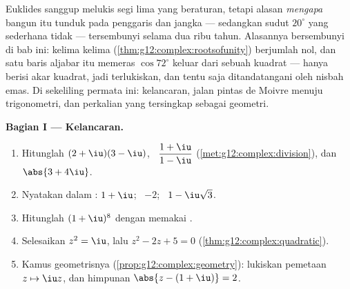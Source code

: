\begin{problem}
\label{pb:g12:complex:1}
Euklides sanggup melukis segi lima yang beraturan, tetapi alasan
\emph{mengapa} bangun itu tunduk pada penggaris dan jangka --- sedangkan
sudut $20^\circ$ yang sederhana tidak --- tersembunyi selama dua ribu
tahun. Alasannya bersembunyi di bab ini: kelima  kelima
(\cref{thm:g12:complex:rootsofunity}) berjumlah nol, dan satu
baris aljabar itu memeras $\cos 72^\circ$ keluar dari sebuah 
kuadrat --- hanya berisi akar kuadrat, jadi terlukiskan, dan tentu saja
ditandatangani oleh nisbah emas. Di sekeliling permata ini: kelancaran, jalan
pintas de Moivre menuju trigonometri, dan perkalian yang tersingkap sebagai
geometri.

\medskip
\noindent\textbf{Bagian I --- Kelancaran.}
\begin{enumerate}
  \item Hitunglah $(2 + \iu)(3 - \iu)$, \
        $\dfrac{1 + \iu}{1 - \iu}$
        (\cref{met:g12:complex:division}), dan
        $\abs{3 + 4\iu}$.
  \item Nyatakan dalam : $1 + \iu$; \ $-2$; \
        $1 - \iu\sqrt3$.
  \item Hitunglah $(1 + \iu)^8$ dengan memakai .
  \item Selesaikan $z^2 = \iu$, lalu $z^2 - 2z + 5 = 0$
        (\cref{thm:g12:complex:quadratic}).
  \item Kamus geometrisnya
        (\cref{prop:g12:complex:geometry}): lukiskan pemetaan
        $z \mapsto \iu z$, dan himpunan
        $\abs{z - (1 + \iu)} = 2$.
\end{enumerate}


\end{problem}
